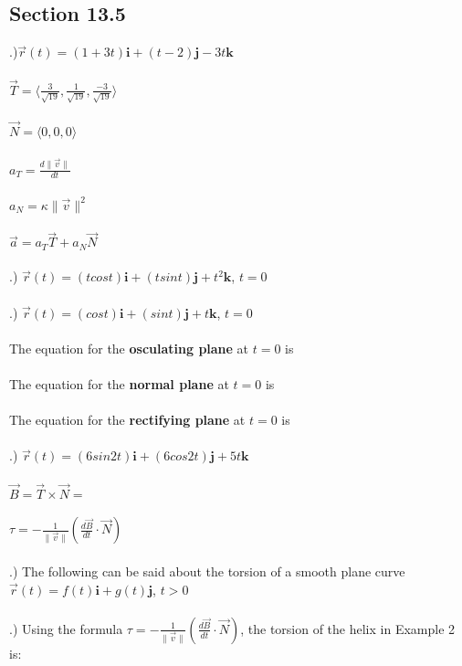 \documentclass[12pt]{article}
\begin{document}
 \clearpage



\subsection*{Section 13.5}
.)$\vec{r}(t) = (1 + 3t)\mathbf{i} + (t - 2)\mathbf{j} - 3t\mathbf{k}$\\\\
\noindent $\vec{T} = \langle \frac{3}{\sqrt{19}}, \frac{1}{\sqrt{19}}, \frac{-3}{\sqrt{19}}\rangle$\\\\
\noindent $\vec{N} = \langle 0, 0, 0\rangle$\\\\
\noindent $a_{T} = \frac{d\|\vec{v} \|}{dt}$\\\\
\noindent $a_{N} = \kappa \| \vec{v} \|^{2}$\\\\
\noindent $\vec{a} = a_{T}\vec{T} + a_{N}\vec{N}$\\\\
.) $\vec{r}(t) = (tcos{t})\mathbf{i} + (tsin{t})\mathbf{j} + t^{2}\mathbf{k}$, \hspace{10pt} $t = 0$\\\\
.) $\vec{r}(t) = (cos{t})\mathbf{i} + (sin{t})\mathbf{j} + t\mathbf{k}$, \hspace{10pt} $t = 0$\\\\
\noindent The equation for the \textbf{osculating plane} at $t = 0$ is \\\\
\noindent The equation for the \textbf{normal plane} at $t = 0$ is \\\\
\noindent The equation for the \textbf{rectifying plane} at $t = 0$ is \\\\

.) $\vec{r}(t) = (6sin{2t})\mathbf{i} + (6cos{2t})\mathbf{j} + 5t\mathbf{k}$\\\\
\noindent $\vec{B} = \vec{T} \times \vec{N} = $\\\\
\noindent $\tau = -\frac{1}{\| \vec{v} \| }(\frac{d\vec{B}}{dt}\cdot \vec{N})$\\\\
.) The following can be said about the torsion of a smooth plane curve $\vec{r}(t) = f(t)\mathbf{i} + g(t)\mathbf{j}$, \hspace{10pt} $t > 0$\\\\
.) Using the formula $\tau = -\frac{1}{\| \vec{v} \|}(\frac{d\vec{B}}{dt} \cdot \vec{N})$, the torsion of the helix in Example 2 is:\\\\
\end{document}
